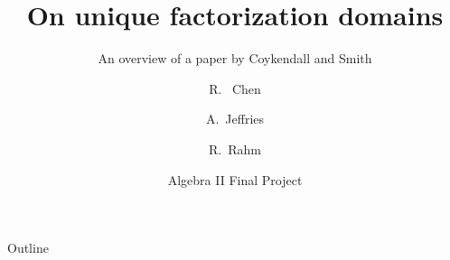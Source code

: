 \documentclass{beamer}
\title{On unique factorization domains}
\subtitle{An overview of a paper by Coykendall and Smith}
\author{R. ~Chen \and A.~Jeffries \and R.~Rahm  }
\institute{
  Department of Mathematics\\
  Georgia Institute of Technology
  }
\date{Algebra II Final Project}
\begin{document}
\begin{frame}
  \titlepage
\end{frame}

\begin{frame}{Outline}
  \tableofcontents
\end{frame}






\end{document}
